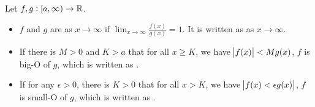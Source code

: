 \begin{definition}
    Let $f,g: [a, \infty) \rightarrow \mathbb{R}$.
    \begin{itemize}
        \item $f$ and $g$ are  as $x \rightarrow \infty$ if $\lim_{x \rightarrow \infty} \frac{f(x)}{g(x)} = 1$. It is written as  as $x \rightarrow \infty$.
        \item If there is $M > 0$ and $K > a$ that for all $x \geq K$, we have $\abs{f(x)} < M g(x)$, $f$ is big-O of $g$, which is written as .
        \item If for any $\epsilon > 0$, there is $K > 0$ that for all $x > K$, we have $\abs{f(x) < \epsilon g(x)}$, $f$ is small-O of $g$, which is written as .
    \end{itemize}
\end{definition}












































































